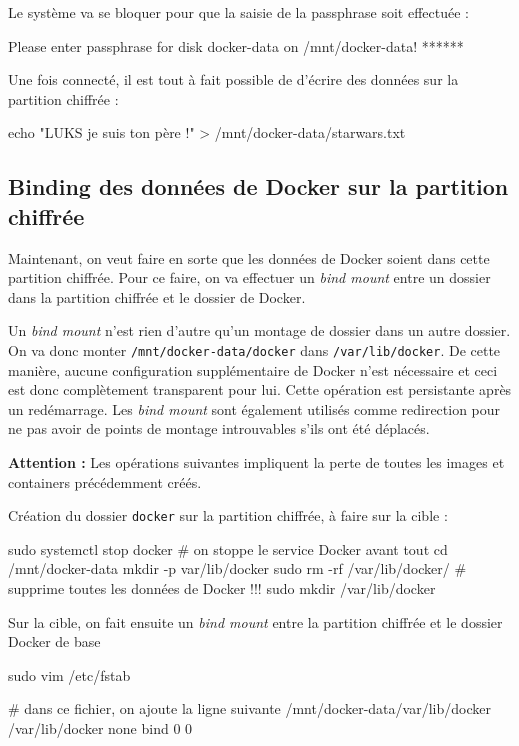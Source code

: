 \documentclass[11pt,a4paper,oneside]{report}
\newcommand{\code}[1]{\texttt{#1}}
\begin{document}
Le système va se bloquer pour que la saisie de la passphrase soit effectuée :
\begin{bashcode}
Please enter passphrase for disk docker-data on /mnt/docker-data! ******
\end{bashcode}

Une fois connecté, il est tout à fait possible de d'écrire des données sur la partition chiffrée :
\begin{bashcode}
echo "LUKS je suis ton père !" > /mnt/docker-data/starwars.txt
\end{bashcode}


\subsection{Binding des données de Docker sur la partition chiffrée}
Maintenant, on veut faire en sorte que les données de Docker soient dans cette partition chiffrée. Pour ce faire, on va effectuer un \textit{bind mount} entre un dossier dans la partition chiffrée et le dossier de Docker.

Un \textit{bind mount} n'est rien d'autre qu'un montage de dossier dans un autre dossier. On va donc monter \code{/mnt/docker-data/docker} dans \code{/var/lib/docker}. De cette manière, aucune configuration supplémentaire de Docker n'est nécessaire et ceci est donc complètement transparent pour lui. Cette opération est persistante après un redémarrage. Les \textit{bind mount} sont également utilisés comme redirection pour ne pas avoir de points de montage introuvables s'ils ont été déplacés.

\textbf{Attention : } Les opérations suivantes impliquent la perte de toutes les images et containers précédemment créés.

Création du dossier \code{docker} sur la partition chiffrée, à faire sur la cible :
\begin{bashcode}
sudo systemctl stop docker # on stoppe le service Docker avant tout
cd /mnt/docker-data
mkdir -p var/lib/docker
sudo rm -rf /var/lib/docker/ # supprime toutes les données de Docker !!!
sudo mkdir /var/lib/docker
\end{bashcode}

Sur la cible, on fait ensuite un \textit{bind mount} entre la partition chiffrée et le dossier Docker de base

\begin{bashcode}
sudo vim /etc/fstab

# dans ce fichier, on ajoute la ligne suivante
/mnt/docker-data/var/lib/docker /var/lib/docker none bind 0 0
\end{bashcode}
\end{document}
